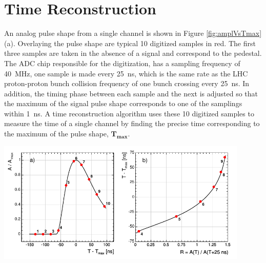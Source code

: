 \section{Time Reconstruction}\label{timereco}
An analog pulse shape from a single channel is shown in Figure \ref{fig:amplVsTmax}(a). 
Overlaying the pulse shape are typical 10 digitized  samples in red. The first three samples are taken in the absence of a signal and correspond to the pedestal.
The ADC chip responsible for the digitization, has a sampling frequency of 40~MHz, \ie one sample is made every 25~ns, which is the same rate as the LHC proton-proton bunch collision frequency of one bunch crossing every 25~ns.
In addition, the timing phase between each sample and the next is adjusted so that the maximum of the signal pulse shape corresponds to one of the samplings within 1~ns.
A time reconstruction algorithm uses these 10 digitized samples to measure the time of a single channel by finding the precise time corresponding to the maximum of the pulse shape, $\mathbf{T_{max}}$. 

\begin{center}
\centering
\mbox{\includegraphics[height=0.50\textwidth, width=0.90\textwidth]{THESISPLOTS/AmplitudeVsTMax.png}}
\label{fig:amplVsTmax}
\end{center}


